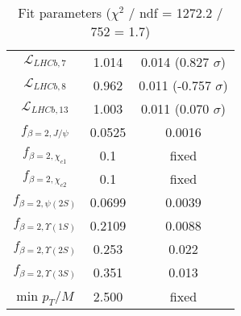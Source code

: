 \begin{table}[h!]
\begin{tabular}{c|c|c}
$\mathcal L_{LHCb,7}$ & 1.014 & 0.014 (0.827 $\sigma$) \\
$\mathcal L_{LHCb,8}$ & 0.962 & 0.011 (-0.757 $\sigma$) \\
$\mathcal L_{LHCb,13}$ & 1.003 & 0.011 (0.070 $\sigma$) \\
$f_{\beta=2,J/\psi}$ & 0.0525 & 0.0016 \\
$f_{\beta=2,\chi_{c1}}$ & 0.1 & fixed \\
$f_{\beta=2,\chi_{c2}}$ & 0.1 & fixed \\
$f_{\beta=2,\psi(2S)}$ & 0.0699 & 0.0039 \\
$f_{\beta=2,\Upsilon(1S)}$ & 0.2109 & 0.0088 \\
$f_{\beta=2,\Upsilon(2S)}$ & 0.253 & 0.022 \\
$f_{\beta=2,\Upsilon(3S)}$ & 0.351 & 0.013 \\
min $p_T/M$ & 2.500 & fixed \\
\end{tabular}
\caption{Fit parameters ($\chi^2$ / ndf = 1272.2 / 752 = 1.7)}
\end{table}

